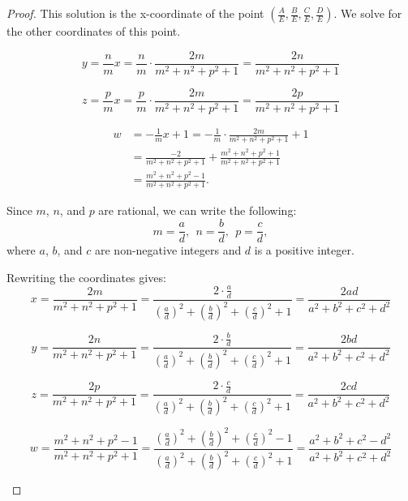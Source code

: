 \documentclass[12pt,table]{article}
\theoremstyle{definition}
\theoremstyle{remark}
\numberwithin{equation}{section}
\begin{document}
\begin{proof}
This solution is the x-coordinate of the point 
$\left(\frac{A}{E},\frac{B}{E},\frac{C}{E},\frac{D}{E}\right)$.
We solve for the other coordinates of this point.


$$y=\frac{n}{m}x=\frac{n}{m}\cdot\frac{2m}{m^2 + n^2 + p^2 +1}
=\frac{2n}{m^2 + n^2 + p^2 +1}$$

$$z=\frac{p}{m}x=\frac{p}{m}\cdot\frac{2m}
{m^2 + n^2 + p^2 +1}=\frac{2p}{m^2 + n^2 + p^2 +1}$$

\begin{align*}
    w & = -\frac{1}{m}x+1=-\frac{1}{m}\cdot\frac{2m}{m^2 + n^2 + p^2 +1}+1
\\
      & = \frac{-2}{m^2 + n^2 + p^2 +1}
       + \frac{m^2 + n^2 + p^2 +1}{m^2 + n^2 + p^2 +1}
\\
      & = \frac{m^2 + n^2 + p^2 -1}{m^2 + n^2 + p^2 +1}.
\end{align*}

Since $m$, $n$, and $p$ are rational, we can write the following:
$$
     m=\frac{a}{d}, \:\:
     n=\frac{b}{d}, \:\:
     p=\frac{c}{d},
$$
where $a$, $b$, and $c$ 
are non-negative integers and $d$ is a positive integer.



Rewriting the coordinates gives:
$$x=\frac{2m}{m^2 + n^2 + p^2 +1}
=\frac{2 \cdot \frac{a}{d}}{\left(\frac{a}{d}\right)^2+\left(\frac{b}{d}\right)^2+\left(\frac{c}{d}\right)^2+1}
=\frac{2ad}{a^2+b^2+c^2+d^2}$$

$$y=\frac{2n}{m^2 + n^2 + p^2 +1}                    
=\frac{2\cdot\frac{b}{d}}{\left(\frac{a}{d}\right)^2+\left(\frac{b}{d}\right)^2+\left(\frac{c}{d}\right)^2+1} 
=\frac{2bd}{a^2+b^2+c^2+d^2}$$

$$z=\frac{2p}{m^2 + n^2 + p^2 +1}                                               
=\frac{2\cdot\frac{c}{d}}{\left(\frac{a}{d}\right)^2+\left(\frac{b}{d}\right)^2+\left(\frac{c}{d}\right)^2+1} 
=\frac{2cd}{a^2+b^2+c^2+d^2}$$


$$w=\frac{m^2 + n^2 + p^2 -1}{m^2 + n^2 + p^2 +1}
=\frac{\left(\frac{a}{d}\right)^2+\left(\frac{b}{d}\right)^2+\left(\frac{c}{d}\right)^2-1} 
{\left(\frac{a}{d}\right)^2+\left(\frac{b}{d}\right)^2+\left(\frac{c}{d}\right)^2+1} 
=\frac{a^2+b^2+c^2-d^2}{a^2+b^2+c^2+d^2}$$






\begin{figure}
\begin{center}  
\begin{tikzpicture}



\end{tikzpicture}
\end{center}
\end{figure}
\end{proof}
\end{document}
